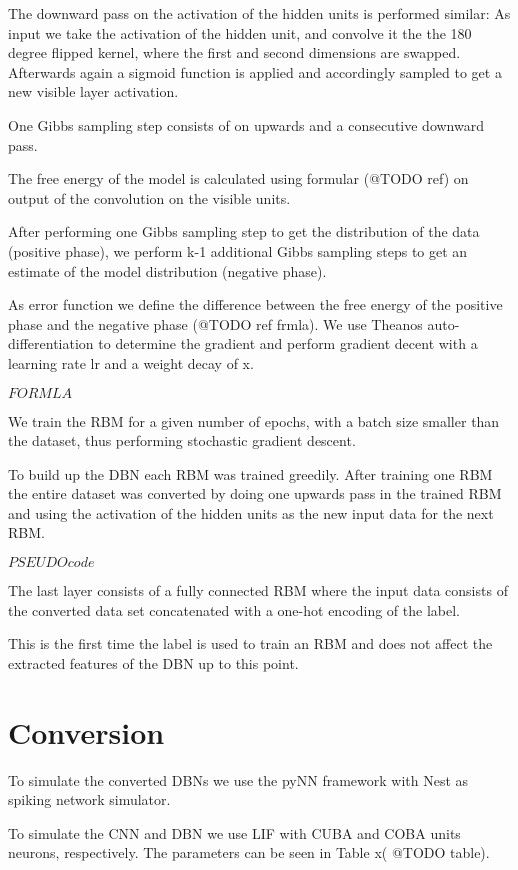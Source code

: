 The downward pass on the activation of the hidden units is performed similar:
As input we take the activation of the hidden unit, and convolve it the the 180 degree flipped kernel, where the first and second dimensions are swapped.
Afterwards again a sigmoid function is applied and accordingly sampled to get a new visible layer activation.

One Gibbs sampling step consists of on upwards and a consecutive downward pass.

The free energy of the model is calculated using formular (@TODO ref) on output of the convolution on the visible units.

After performing one Gibbs sampling step to get the distribution of the data (positive phase), we perform k-1 additional Gibbs sampling steps to get an estimate of the model distribution (negative phase).

As error function we define the difference between the free energy of the positive phase and the negative phase (@TODO ref frmla).
We use Theanos auto-differentiation to determine the gradient and perform gradient decent with a learning rate lr and a weight decay of x.

$FORMLA$

We train the RBM for a given number of epochs, with a batch size smaller than the dataset, thus performing stochastic gradient descent.

To build up the DBN each RBM was trained greedily.
After training one RBM the entire dataset was converted by doing one upwards pass in the trained RBM and using the activation of the hidden units as the new input data for the next RBM.

$PSEUDO code$

The last layer consists of a fully connected RBM where the input data consists of the converted data set concatenated with a one-hot encoding of the label.

This is the first time the label is used to train an RBM and does not affect the extracted features of the DBN up to this point.  

\section{Conversion}

To simulate the converted DBNs we use the pyNN framework with Nest as spiking network simulator.

To simulate the CNN and DBN we use LIF with CUBA and COBA units neurons, respectively.
The parameters can be seen in Table x( @TODO table).

